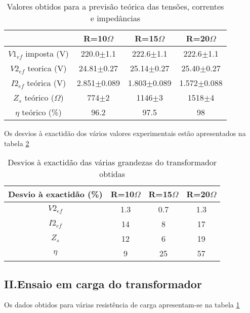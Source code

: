 \documentclass[%
  reprint,
  nofootinbib,
  amsmath,amssymb,
  aps,
  10pt,
]{revtex4-1}
\begin{document}
\begin{table}[h]
\begin{tabular}{c|c|c|c}
                         & R=10$\Omega$    & R=15$\Omega$    & R=20$\Omega$    \\ \hline
$V1_{ef}$ imposta (V)    & 220.0$\pm$1.1   & 222.6$\pm$1.1   & 222.6$\pm$1.1   \\ \hline
$V2_{ef}$ teorica (V)    & 24.81$\pm$0.27  & 25.14$\pm$0.27  & 25.40$\pm$0.27  \\ \hline
$I2_{ef}$ teórica (V)    & 2.851$\pm$0.089 & 1.803$\pm$0.089 & 1.572$\pm$0.088 \\ \hline
$Z_s$ teórico ($\Omega$) & 774$\pm$2       & 1146$\pm$3      & 1518$\pm$4     \\ \hline
$\eta$ teórico (\%) &96.2&97.5&98
\end{tabular}
\caption{Valores obtidos para a previsão teórica das tensões, correntes e impedâncias}
\label{tab:carga}
\end{table}
Os desvios à exactidão dos vários valores experimentais estão apresentados na tabela \ref{tab:exac}
\begin{table}[h]
\begin{tabular}{c|c|c|c}
Desvio à exactidão (\%) & R=10$\Omega$ & R=15$\Omega$ & R=20$\Omega$ \\ \hline
$V2_{ef}$               & 1.3          & 0.7          & 1.3          \\ \hline
$I2_{ef}$               & 14           & 8            & 17           \\ \hline
$Z_s$                   & 12           & 6            & 19           \\ \hline
$\eta$                 &9           &25           &57
\end{tabular}
\caption{Desvios à exactidão das várias grandezas do transformador obtidas}
\label{tab:exac}
\end{table}

\subsection*{II.Ensaio em carga do transformador}
Os dados obtidos para várias resistência de carga apresentam-se na tabela \ref{tab:carga}
\end{document}
